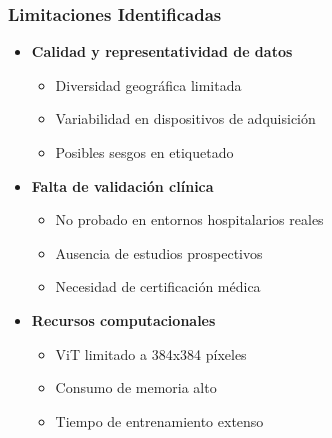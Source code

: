 \begin{frame}
\frametitle{Limitaciones Identificadas}
\begin{itemize}
    \item \textbf{Calidad y representatividad de datos}
    \begin{itemize}
        \item Diversidad geográfica limitada
        \item Variabilidad en dispositivos de adquisición
        \item Posibles sesgos en etiquetado
    \end{itemize}
    \item \textbf{Falta de validación clínica}
    \begin{itemize}
        \item No probado en entornos hospitalarios reales
        \item Ausencia de estudios prospectivos
        \item Necesidad de certificación médica
    \end{itemize}
    \item \textbf{Recursos computacionales}
    \begin{itemize}
        \item ViT limitado a 384x384 píxeles
        \item Consumo de memoria alto
        \item Tiempo de entrenamiento extenso
    \end{itemize}
\end{itemize}
\end{frame}

